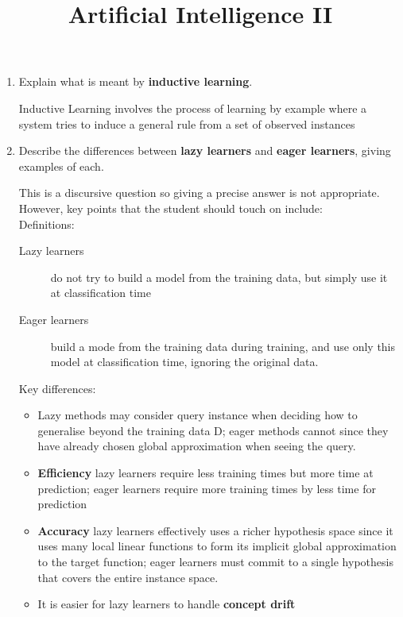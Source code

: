 \documentclass[--SOLUTION-OPTION--]{ditpaper}
\title{Artificial Intelligence II}
\begin{document}

\question
\begin{enumerate}
	\item Explain what is meant by \textbf{inductive learning}.
	\begin{answer}
		Inductive Learning involves the process of learning by example where a system tries to induce a general rule from a set of observed instances
	\end{answer}
\item Describe the differences between \textbf{lazy learners} and \textbf{eager learners}, giving examples of each.
		\begin{answer}
This is a discursive question so giving a precise answer is not appropriate. However, key points that the student should touch on include:\\
			Definitions:
			\begin{description}
				\item [Lazy learners] do not try to build a model from the training data, but simply use it at classification time
				\item [Eager learners] build a mode from the training data during training, and use only this model at classification time, ignoring the original data.
			\end{description}
			Key differences:
			\begin{itemize}
				\item Lazy methods may consider query instance when deciding how to generalise beyond the training data D; eager methods cannot since they have already chosen global approximation when seeing the query.
				\item \textbf{Efficiency} lazy learners require less training times but more time at prediction; eager learners require more training times by less time for prediction
				\item \textbf{Accuracy} lazy learners effectively uses a richer hypothesis space since it uses many local linear functions to form its implicit global approximation to the target function; eager learners must commit to a single hypothesis that covers the entire instance space.
				\item It is easier for lazy learners to handle \textbf{concept drift}
			\end{itemize}

\end{answer}
\end{enumerate}
\end{document}
